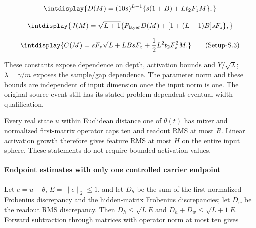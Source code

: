\begingroup\renewcommand{\theHequation}{intdisplay.848}
\begin{equation*}
\intdisplay{
D(M)=(10s)^{L-1}\{s(1+B)+Lt_2F_zM\},
}
\end{equation*}
\endgroup

\begingroup\renewcommand{\theHequation}{intdisplay.849}
\begin{equation*}
\intdisplay{
J(M)=\sqrt{L+1}\{P_{\rm layer}D(M)+[1+(L-1)B]sF_z\},
}
\end{equation*}
\endgroup

\label{int:eq-setup-s-3}
\begingroup\renewcommand{\theHequation}{intdisplay.850}
\begin{equation}
\intdisplay{
C(M)=sF_z\sqrt L+LBsF_z+\frac12L^2t_2F_z^2M.
}
\tag{Setup-S.3}
\label{int:eq-0414-setup-s-3}
\end{equation}
\endgroup


These constants expose dependence on depth, activation bounds and \(Y/\sqrt\lambda\); \(\lambda=\gamma/m\) exposes the sample/gap dependence. The parameter norm and these bounds are independent of input dimension once the input norm is one. The original source event still has its stated problem-dependent eventual-width qualification.



Every real state \(u\) within Euclidean distance one of \(\theta(t)\) has mixer and normalized first-matrix operator caps ten and readout RMS at most \(R\). Linear activation growth therefore gives feature RMS at most \(H\) on the entire input sphere. These statements do not require bounded activation values.


\paragraph{Endpoint estimates with only one controlled carrier endpoint}
\label{int:setup-stability-2}
\mbox{}\par\smallskip


Let \(e=u-\theta\), \(E=\|e\|_2\le1\), and let \(D_h\) be the sum of the first normalized Frobenius discrepancy and the hidden-matrix Frobenius discrepancies; let \(D_w\) be the readout RMS discrepancy. Then \(D_h\le\sqrt L E\) and \(D_h+D_w\le\sqrt{L+1}E\). Forward subtraction through matrices with operator norm at most ten gives


